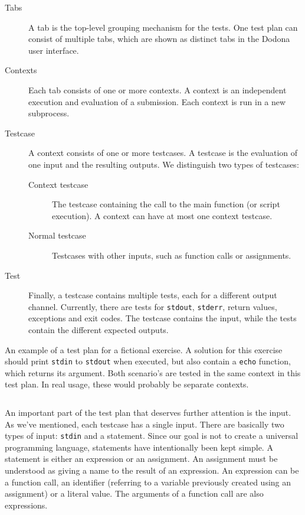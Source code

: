 \documentclass[5p,number]{elsarticle}
\begin{document}
    \begin{description}
        \item[Tabs] A tab is the top-level grouping mechanism for the tests.
        One test plan can consist of multiple tabs, which are shown as distinct tabs in the Dodona user interface.
        \item[Contexts] Each tab consists of one or more contexts.
        A context is an independent execution and evaluation of a submission.
        Each context is run in a new subprocess.
        \item[Testcase] A context consists of one or more testcases.
        A testcase is the evaluation of one input and the resulting outputs.
        We distinguish two types of testcases:
        \begin{description}
            \item[Context testcase] The testcase containing the call to the main function (or script execution).
            A context can have at most one context testcase.
            \item[Normal testcase] Testcases with other inputs, such as function calls or assignments.
        \end{description}
        \item[Test] Finally, a testcase contains multiple tests, each for a different output channel.
        Currently, there are tests for \texttt{stdout}, \texttt{stderr}, return values, exceptions and exit codes.
        The testcase contains the input, while the tests contain the different expected outputs.
    \end{description}

    \begin{listing}
        \label{lst:testplan}
        \caption{
        An example of a test plan for a fictional exercise.
        A solution for this exercise should print \texttt{stdin} to \texttt{stdout} when executed, but also contain a \texttt{echo} function, which returns its argument.
        Both scenario's are tested in the same context in this test plan.
        In real usage, these would probably be separate contexts.
        }
        \inputminted{json}{code/extended-plan.tson}
    \end{listing}

    An important part of the test plan that deserves further attention is the input.
    As we've mentioned, each testcase has a single input.
    There are basically two types of input: \texttt{stdin} and a statement.
    Since our goal is not to create a universal programming language, statements have intentionally been kept simple.
    A statement is either an expression or an assignment.
    An assignment must be understood as giving a name to the result of an expression.
    An expression can be a function call, an identifier (referring to a variable previously created using an assignment) or a literal value.
    The arguments of a function call are also expressions.
\end{document}
